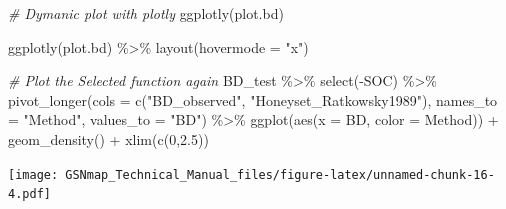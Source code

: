 \documentclass[
  10pt,
  b5paper,
  oneside]{book}
\newenvironment{Shaded}{\begin{snugshade}}{\end{snugshade}}
\newcommand{\AttributeTok}[1]{\textcolor[rgb]{0.77,0.63,0.00}{#1}}
\newcommand{\CommentTok}[1]{\textcolor[rgb]{0.56,0.35,0.01}{\textit{#1}}}
\newcommand{\DecValTok}[1]{\textcolor[rgb]{0.00,0.00,0.81}{#1}}
\newcommand{\FloatTok}[1]{\textcolor[rgb]{0.00,0.00,0.81}{#1}}
\newcommand{\FunctionTok}[1]{\textcolor[rgb]{0.00,0.00,0.00}{#1}}
\newcommand{\NormalTok}[1]{#1}
\newcommand{\SpecialCharTok}[1]{\textcolor[rgb]{0.00,0.00,0.00}{#1}}
\newcommand{\StringTok}[1]{\textcolor[rgb]{0.31,0.60,0.02}{#1}}
\begin{document}
\begin{Shaded}
\begin{Highlighting}[]
\CommentTok{\# Dymanic plot with plotly }
\FunctionTok{ggplotly}\NormalTok{(plot.bd)}
\end{Highlighting}
\end{Shaded}

\begin{Shaded}
\begin{Highlighting}[]
\FunctionTok{ggplotly}\NormalTok{(plot.bd) }\SpecialCharTok{\%\textgreater{}\%}
  \FunctionTok{layout}\NormalTok{(}\AttributeTok{hovermode =} \StringTok{"x"}\NormalTok{)}
\end{Highlighting}
\end{Shaded}

\begin{Shaded}
\begin{Highlighting}[]
\CommentTok{\# Plot the Selected function again}
\NormalTok{BD\_test }\SpecialCharTok{\%\textgreater{}\%} 
  \FunctionTok{select}\NormalTok{(}\SpecialCharTok{{-}}\NormalTok{SOC) }\SpecialCharTok{\%\textgreater{}\%} 
  \FunctionTok{pivot\_longer}\NormalTok{(}\AttributeTok{cols =} \FunctionTok{c}\NormalTok{(}\StringTok{"BD\_observed"}\NormalTok{, }\StringTok{"Honeyset\_Ratkowsky1989"}\NormalTok{), }
               \AttributeTok{names\_to =} \StringTok{"Method"}\NormalTok{, }\AttributeTok{values\_to =} \StringTok{"BD"}\NormalTok{) }\SpecialCharTok{\%\textgreater{}\%} 
  \FunctionTok{ggplot}\NormalTok{(}\FunctionTok{aes}\NormalTok{(}\AttributeTok{x =}\NormalTok{ BD, }\AttributeTok{color =}\NormalTok{ Method)) }\SpecialCharTok{+} 
  \FunctionTok{geom\_density}\NormalTok{() }\SpecialCharTok{+} \FunctionTok{xlim}\NormalTok{(}\FunctionTok{c}\NormalTok{(}\DecValTok{0}\NormalTok{,}\FloatTok{2.5}\NormalTok{))}
\end{Highlighting}
\end{Shaded}

\texttt{[image: GSNmap\_Technical\_Manual\_files/figure-latex/unnamed-chunk-16-4.pdf]}
\end{document}
